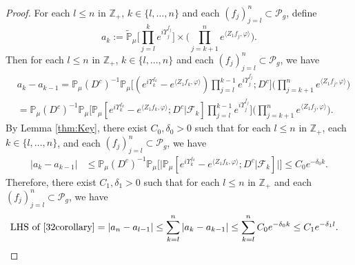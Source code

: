 \documentclass[12pt,a4paper]{amsart}
\theoremstyle{plain}
\theoremstyle{definition}
\numberwithin{equation}{section}
\begin{document}
\begin{proof}
  For each $l\leq n$ in $\mathbb Z_+$, $k \in \{l,\dots,n\}$ and each $(f_j)_{j=l}^n\subset \mathcal P_g$, define
  \[
    a_k
    :=  \mathbb{\widetilde{P}}_{\mu}\Big[\prod_{j=l}^{k} e^{i\Upsilon_j^{f_j}}\Big] \times \Big(\prod_{j=k+1}^{n} e^{ \langle Z_1f_j,\varphi \rangle} \Big).
  \]
  Then for each $l\leq n$ in $\mathbb Z_+$, $k \in \{l,\dots,n\}$ and each $(f_j)_{j=l}^n\subset \mathcal P_g$, we have
  \begin{align}
    & a_{k} - a_{k-1}
      =\mathbb{P}_{\mu}(D^c)^{-1} \mathbb{P}_{\mu}\Big[(e^{i\Upsilon^{f_k}_k}-e^{\langle Z_1f_k, \varphi\rangle})\prod_{j=l}^{k-1} e^{i\Upsilon_j^{f_j}};D^c\Big] \Big(\prod_{j=k+1}^n e^{\langle Z_1f_j, \varphi\rangle}\Big)\\ 
    & =\mathbb{P}_{\mu}(D^c)^{-1} \mathbb{P}_{\mu}\Big[\mathbb P_\mu[e^{i\Upsilon_k^{f_k}}-e^{\langle Z_1f_k, \varphi \rangle}; D^c|\mathscr F_k] \prod_{j=l}^{k-1} e^{i\Upsilon_j^{f_j}}\Big] \Big(\prod_{j=k+1}^{n}e^{\langle Z_1f_j, \varphi\rangle}\Big).
  \end{align}
  By Lemma \ref{thm:Key}, there exist $C_0,\delta_0 >0$ such that for each $l\leq n$ in $\mathbb Z_+$, each $k \in \{l,\dots , n\}$, and each $(f_j)_{j=l}^n\subset \mathcal P_g$, we have
  \begin{align}
    | a_{k} - a_{k-1}|
    & \leq \mathbb{P}_{\mu}(D^c)^{-1}\mathbb{P}_{\mu}\Big[\big|\mathbb P_\mu[e^{i\Upsilon_k^{f_k}}-e^{\langle Z_1f_k, \varphi \rangle}; D^c | \mathscr{F}_k]\big|\Big]
    \leq C_0 e^{-\delta_0 k}.
  \end{align}
  Therefore, there exist $C_1,\delta_1 >0$ such that for each $l\leq n$ in $\mathbb Z_+$ and each $(f_j)_{j=l}^n\subset \mathcal P_g$, we have
  \begin{align}
    \text{LHS of \eqref{32corollary}}
    & = \left|a_n-a_{l-1}\right|
    \leq \sum_{k=l}^n\left|a_{k}-a_{k-1}\right|
    \leq \sum_{k=l}^n C_0 e^{-\delta_0 k}
      \leq C_1 e^{- \delta_1 l}.
      \qedhere
  \end{align}
\end{proof}
\end{document}
